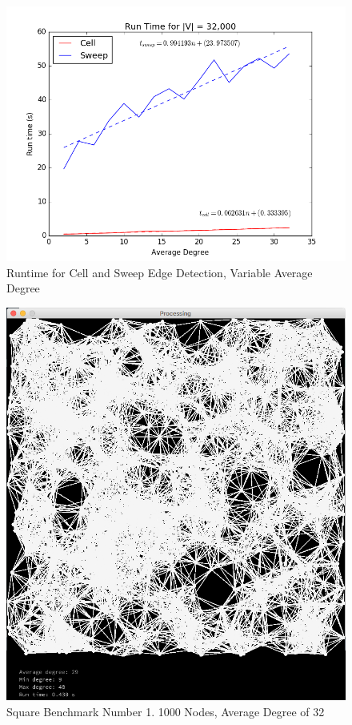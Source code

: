 \documentclass{article}
\begin{document}
\begin{figure}
    \centering
    \includegraphics[scale=0.6]{./graphs/run_time_var_avg_deg.png}
    \caption{Runtime for Cell and Sweep Edge Detection, Variable Average Degree}
    \label{varavgdeg}
\end{figure}

\begin{figure}
    \centering
    \includegraphics[scale=0.45]{./images/square_0.png}
    \caption{Square Benchmark Number 1. 1000 Nodes, Average Degree of 32}
    \label{square0}
\end{figure}
\end{document}
